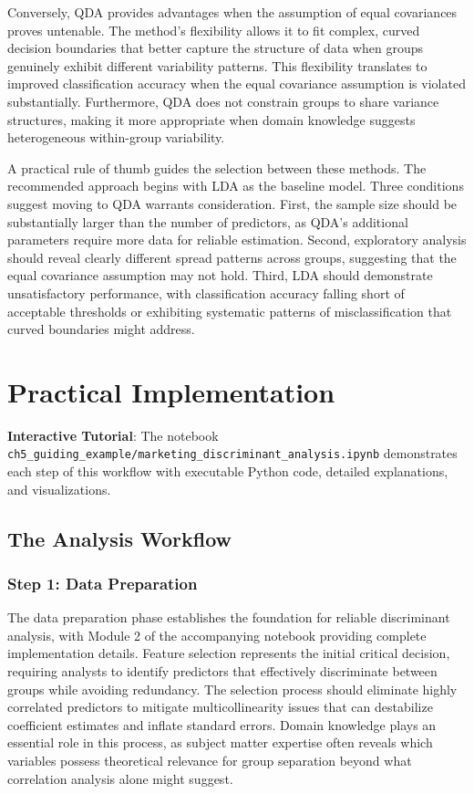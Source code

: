 \documentclass[
]{article}
\begin{document}
Conversely, QDA provides advantages when the assumption of equal
covariances proves untenable. The method's flexibility allows it to fit
complex, curved decision boundaries that better capture the structure of
data when groups genuinely exhibit different variability patterns. This
flexibility translates to improved classification accuracy when the
equal covariance assumption is violated substantially. Furthermore, QDA
does not constrain groups to share variance structures, making it more
appropriate when domain knowledge suggests heterogeneous within-group
variability.

A practical rule of thumb guides the selection between these methods.
The recommended approach begins with LDA as the baseline model. Three
conditions suggest moving to QDA warrants consideration. First, the
sample size should be substantially larger than the number of
predictors, as QDA's additional parameters require more data for
reliable estimation. Second, exploratory analysis should reveal clearly
different spread patterns across groups, suggesting that the equal
covariance assumption may not hold. Third, LDA should demonstrate
unsatisfactory performance, with classification accuracy falling short
of acceptable thresholds or exhibiting systematic patterns of
misclassification that curved boundaries might address.

\section{Practical Implementation}

\textbf{Interactive Tutorial}: The notebook
\texttt{ch5\_guiding\_example/marketing\_discriminant\_analysis.ipynb}
demonstrates each step of this workflow with executable Python code,
detailed explanations, and visualizations.

\subsection{The Analysis Workflow}

\subsubsection{Step 1: Data Preparation}

The data preparation phase establishes the foundation for reliable
discriminant analysis, with Module 2 of the accompanying notebook
providing complete implementation details. Feature selection represents
the initial critical decision, requiring analysts to identify predictors
that effectively discriminate between groups while avoiding redundancy.
The selection process should eliminate highly correlated predictors to
mitigate multicollinearity issues that can destabilize coefficient
estimates and inflate standard errors. Domain knowledge plays an
essential role in this process, as subject matter expertise often
reveals which variables possess theoretical relevance for group
separation beyond what correlation analysis alone might suggest.
\end{document}
